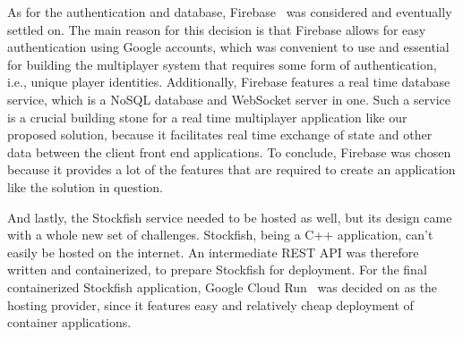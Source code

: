 As for the authentication and database, Firebase~\cite{firebase} was considered and eventually settled on.
The main reason for this decision is that Firebase allows for easy authentication using Google accounts, which was
convenient to use and essential for building the multiplayer system that requires some form of authentication,
i.e., unique player identities.
Additionally, Firebase features a real time database service, which is a NoSQL database and WebSocket server in one.
Such a service is a crucial building stone for a real time multiplayer application like our proposed solution, because
it facilitates real time exchange of state and other data between the client front end applications.
To conclude, Firebase was chosen because it provides a lot of the features that are required to create an application
like the solution in question.

And lastly, the Stockfish service needed to be hosted as well, but its design came with a whole new set of challenges.
Stockfish, being a C++ application, can't easily be hosted on the internet.
An intermediate REST API was therefore written and containerized, to prepare Stockfish for deployment.
For the final containerized Stockfish application, Google Cloud Run~\cite{google-cloud-run} was decided on as the
hosting provider, since it features easy and relatively cheap deployment of container applications.
